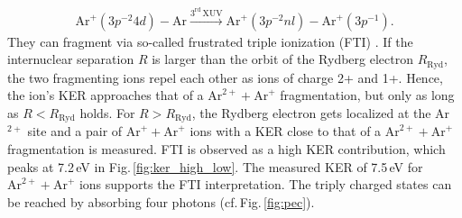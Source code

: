 \documentclass[%
 aip,
rsi,%
 amsmath,amssymb,
preprint,%
]{revtex4-1}
\begin{document}
%
	\begin{equation}
 	\mathrm{Ar}^+(3p^{-2}4d)-\mathrm{Ar} \xrightarrow[]{3^\text{rd}\,\text{XUV}} \mathrm{Ar}^+(3p^{-2}nl)-\mathrm{Ar}^+(3p^{-1}).  
 	 \label{eq:rydberg}
	\end{equation}  
%
They can fragment via so-called frustrated triple ionization (FTI) \cite{Manschwetus2010,Ulrich2010,Wu2011}. If the internuclear separation $R$ is larger than the orbit of the Rydberg electron $R_{\mathrm{Ryd}}$, the two fragmenting ions repel each other as ions of charge 2+ and 1+. Hence, the ion's KER approaches that of a $\mathrm{Ar}^{2+} + \mathrm{Ar}^{+}$ fragmentation, but only as long as $R < R_{\mathrm{Ryd}}$ holds. For $R > R_{\mathrm{Ryd}}$, the Rydberg electron gets localized at the Ar$^{2+}$ site and a pair of $\mathrm{Ar}^+ + \mathrm{Ar}^{+}$ ions with a KER close to that of a $\mathrm{Ar}^{2+} + \mathrm{Ar}^{+}$ fragmentation is measured. FTI is observed as a high KER contribution, which peaks at 7.2\,eV in Fig.\,\ref{fig:ker_high_low}. The measured KER of 7.5\,eV for $\mathrm{Ar}^{2+} + \mathrm{Ar}^{+}$ ions supports the FTI interpretation. The triply charged states can be reached by absorbing four photons (cf.\,Fig.\,\ref{fig:pec}).
\end{document}

